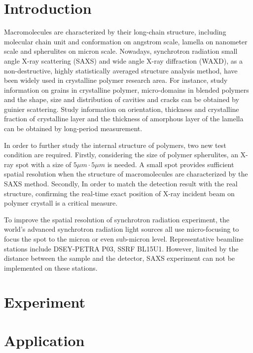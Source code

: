 \documentclass{Head}
\begin{document}
\tableofcontents
\linenumbers
\section{Introduction}
Macromolecules are characterized by their long-chain structure, including molecular chain unit and conformation on angstrom scale, lamella on nanometer scale and spherulites on micron scale.
Nowadays, synchrotron radiation small angle X-ray scattering (SAXS) and wide angle X-ray diffraction (WAXD), as a non-destructive, highly statistically averaged structure analysis method, have been widely used in crystalline polymer research area.
For instance, study information on grains in crystalline polymer, micro-domains in blended polymers and the shape, size and distribution of cavities and cracks can be obtained by guinier scattering.
Study information on orientation, thickness and crystalline fraction of crystalline layer and the thickness of amorphous layer of the lamella can be obtained by long-period measurement.


In order to further study the internal structure of polymers, two new test condition are required.
Firstly, considering the size of polymer spherulites, an X-ray spot with a size of $5\mu m \cdot 5\mu m$ is needed.
A small spot provides sufficient spatial resolution when the structure of macromolecules are characterized by the SAXS method.
Secondly, In order to match the detection result with the real structure, confirming the real-time exact position of X-ray incident beam on polymer crystall is a critical measure.


To improve the spatial resolution of synchrotron radiation experiment, the world’s advanced synchrotron radiation light sources all use micro-focusing to focus the spot to the micron or even sub-micron level.
Representative beamline stations include DSEY-PETRA \uppercase\expandafter{} P03, SSRF BL15U1. However, limited by the distance between the sample and the detector, SAXS experiment can not be implemented on these stations.
\section{Experiment}
\section{Application}
\end{document}
